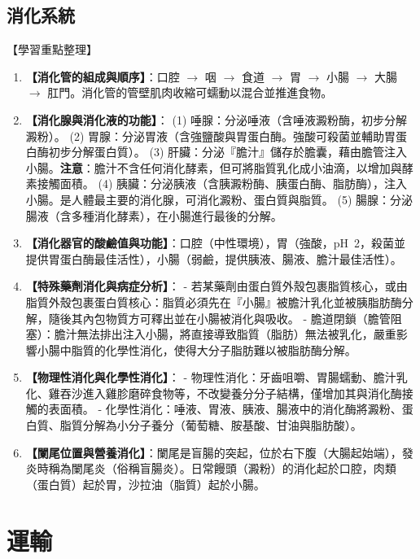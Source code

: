 \documentclass[11pt,a4paper]{article}
\begin{document}
\subsection{消化系統}
\begin{learningpoints}{【學習重點整理】}
\begin{enumerate}[label=\arabic*.]
  \item \textbf{【消化管的組成與順序】}：口腔 $\rightarrow$ 咽 $\rightarrow$ 食道 $\rightarrow$ 胃 $\rightarrow$ 小腸 $\rightarrow$ 大腸 $\rightarrow$ 肛門。消化管的管壁肌肉收縮可蠕動以混合並推進食物。
  \item \textbf{【消化腺與消化液的功能】}：
  (1) 唾腺：分泌唾液（含唾液澱粉酶，初步分解澱粉）。
  (2) 胃腺：分泌胃液（含強鹽酸與胃蛋白酶。強酸可殺菌並輔助胃蛋白酶初步分解蛋白質）。
  (3) 肝臟：分泌『膽汁』儲存於膽囊，藉由膽管注入小腸。\textbf{注意}：膽汁不含任何消化酵素，但可將脂質乳化成小油滴，以增加與酵素接觸面積。
  (4) 胰臟：分泌胰液（含胰澱粉酶、胰蛋白酶、脂肪酶），注入小腸。是人體最主要的消化腺，可消化澱粉、蛋白質與脂質。
  (5) 腸腺：分泌腸液（含多種消化酵素），在小腸進行最後的分解。
  \item \textbf{【消化器官的酸鹼值與功能】}：口腔（中性環境），胃（強酸，pH~2，殺菌並提供胃蛋白酶最佳活性），小腸（弱鹼，提供胰液、腸液、膽汁最佳活性）。
  \item \textbf{【特殊藥劑消化與病症分析】}：
  - 若某藥劑由蛋白質外殼包裹脂質核心，或由脂質外殼包裹蛋白質核心：脂質必須先在『小腸』被膽汁乳化並被胰脂肪酶分解，隨後其內包物質方可釋出並在小腸被消化與吸收。
  - 膽道閉鎖（膽管阻塞）：膽汁無法排出注入小腸，將直接導致脂質（脂肪）無法被乳化，嚴重影響小腸中脂質的化學性消化，使得大分子脂肪難以被脂肪酶分解。
  \item \textbf{【物理性消化與化學性消化】}：
  - 物理性消化：牙齒咀嚼、胃腸蠕動、膽汁乳化、雞吞沙進入雞胗磨碎食物等，不改變養分分子結構，僅增加其與消化酶接觸的表面積。
  - 化學性消化：唾液、胃液、胰液、腸液中的消化酶將澱粉、蛋白質、脂質分解為小分子養分（葡萄糖、胺基酸、甘油與脂肪酸）。
  \item \textbf{【闌尾位置與營養消化】}：闌尾是盲腸的突起，位於右下腹（大腸起始端），發炎時稱為闌尾炎（俗稱盲腸炎）。日常饅頭（澱粉）的消化起於口腔，肉類（蛋白質）起於胃，沙拉油（脂質）起於小腸。
\end{enumerate}
\end{learningpoints}

\newpage
\section{運輸}
\end{document}
